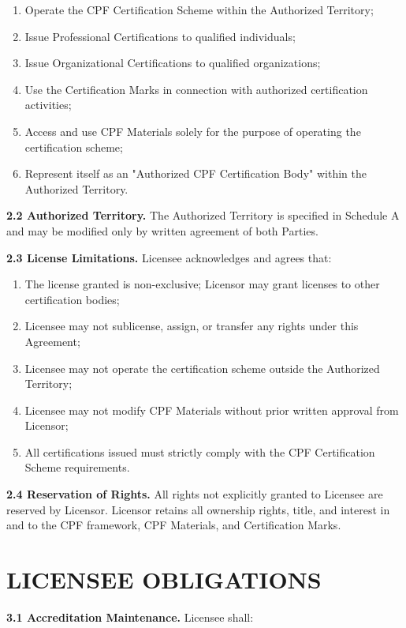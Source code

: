 \documentclass[11pt,a4paper]{article}
\begin{document}
\begin{enumerate}[label=\alph*)]
\item Operate the CPF Certification Scheme within the Authorized Territory;
\item Issue Professional Certifications to qualified individuals;
\item Issue Organizational Certifications to qualified organizations;
\item Use the Certification Marks in connection with authorized certification activities;
\item Access and use CPF Materials solely for the purpose of operating the certification scheme;
\item Represent itself as an "Authorized CPF Certification Body" within the Authorized Territory.
\end{enumerate}

\textbf{2.2 Authorized Territory.} The Authorized Territory is specified in Schedule A and may be modified only by written agreement of both Parties.

\textbf{2.3 License Limitations.} Licensee acknowledges and agrees that:

\begin{enumerate}[label=\alph*)]
\item The license granted is non-exclusive; Licensor may grant licenses to other certification bodies;
\item Licensee may not sublicense, assign, or transfer any rights under this Agreement;
\item Licensee may not operate the certification scheme outside the Authorized Territory;
\item Licensee may not modify CPF Materials without prior written approval from Licensor;
\item All certifications issued must strictly comply with the CPF Certification Scheme requirements.
\end{enumerate}

\textbf{2.4 Reservation of Rights.} All rights not explicitly granted to Licensee are reserved by Licensor. Licensor retains all ownership rights, title, and interest in and to the CPF framework, CPF Materials, and Certification Marks.

\section{LICENSEE OBLIGATIONS}

\textbf{3.1 Accreditation Maintenance.} Licensee shall:
\end{document}
